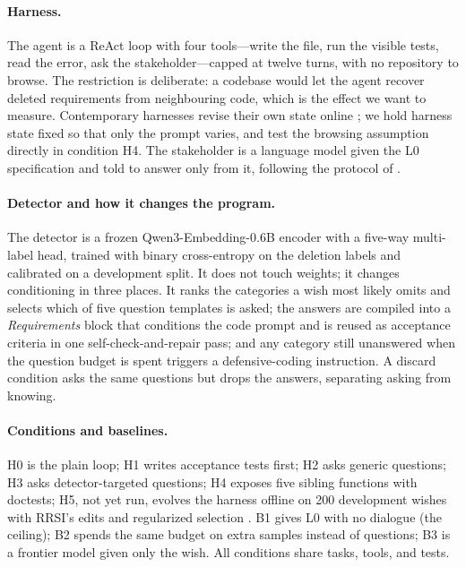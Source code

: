 \documentclass{article}
\begin{document}
\paragraph{Harness.}
The agent is a ReAct loop with four tools---write the file, run the visible tests, read the
error, ask the stakeholder---capped at twelve turns, with no repository to browse. The
restriction is deliberate: a codebase would let the agent recover deleted requirements from
neighbouring code, which is the effect we want to measure. Contemporary
harnesses revise their own state online \citep{xiao2026reharness}; we hold harness state fixed so
that only the prompt varies, and test the browsing assumption directly in condition H4. The
stakeholder is a language model given the L0 specification and told to answer only from it,
following the protocol of \citep{mu2023clarifygpt}.

\paragraph{Detector and how it changes the program.}
The detector is a frozen Qwen3-Embedding-0.6B encoder with a five-way multi-label head, trained
with binary cross-entropy on the deletion labels and calibrated on a development split. It does
not touch weights; it changes conditioning in three places. It ranks the categories a wish most
likely omits and selects which of five question templates is asked; the answers are compiled
into a \emph{Requirements} block that conditions the code prompt and is reused as acceptance
criteria in one self-check-and-repair pass; and any category still unanswered when the question
budget is spent triggers a defensive-coding instruction. A discard condition asks the same
questions but drops the answers, separating asking from knowing.

\paragraph{Conditions and baselines.}
H0 is the plain loop; H1 writes acceptance tests first; H2 asks generic questions; H3 asks
detector-targeted questions; H4 exposes five sibling functions with doctests; H5, not yet run,
evolves the harness offline on 200 development wishes with RRSI's edits and regularized
selection \citep{xia2026rrsi}. B1 gives L0 with no dialogue (the ceiling); B2 spends the same
budget on extra samples instead of questions; B3 is a frontier model given only the wish. All conditions share tasks, tools, and tests.
\end{document}
